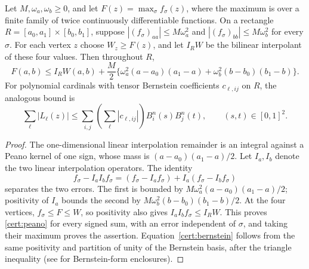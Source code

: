 \begin{lemma}\label{cert:positive}
Let $M,\omega_a,\omega_b\geq0$, and let
$F(z)=\max_{\sigma}f_\sigma(z)$, where the maximum is over a finite
family of twice continuously differentiable functions.
On a rectangle $R=[a_0,a_1]\times[b_0,b_1]$, suppose
$|(f_\sigma)_{aa}|\leq M\omega_a^2$ and
$|(f_\sigma)_{bb}|\leq M\omega_b^2$ for every $\sigma$.
For each vertex $z$ choose $W_z\geq F(z)$, and let $I_RW$ be the
bilinear interpolant of these four values. Then throughout $R$,
\begin{equation}\label{cert:peano}
 F(a,b)\leq I_RW(a,b)+\frac M2\{
 \omega_a^2(a-a_0)(a_1-a)+\omega_b^2(b-b_0)(b_1-b)\}.
\end{equation}
For polynomial cardinals with tensor
Bernstein coefficients $c_{\ell,ij}$ on $R$, the analogous bound is
\begin{equation}\label{cert:bernstein}
 \sum_\ell|L_\ell(z)|\leq
 \sum_{i,j}\left(\sum_\ell|c_{\ell,ij}|\right)B_i^n(s)B_j^n(t),
 \qquad (s,t)\in[0,1]^2.
\end{equation}
\end{lemma}
\begin{proof}
The one-dimensional linear interpolation remainder is an integral against
a Peano kernel of one sign, whose mass is $(a-a_0)(a_1-a)/2$.
Let $I_a,I_b$ denote the two linear interpolation operators. The identity
\[
 f_\sigma-I_aI_bf_\sigma
   =(f_\sigma-I_af_\sigma)+I_a(f_\sigma-I_bf_\sigma)
\]
separates the two errors. The first is bounded by
$M\omega_a^2(a-a_0)(a_1-a)/2$; positivity of $I_a$ bounds the second
by $M\omega_b^2(b-b_0)(b_1-b)/2$. At the four vertices,
$f_\sigma\leq F\leq W$, so positivity also gives
$I_aI_bf_\sigma\leq I_RW$. This proves \eqref{cert:peano} for
every signed sum, with an error independent of $\sigma$, and taking
their maximum proves the assertion.
Equation~\eqref{cert:bernstein} follows from the same positivity and
partition of unity of the Bernstein basis, after the triangle inequality
(see \cite{Lorentz1986} for Bernstein-form enclosures).
\end{proof}

